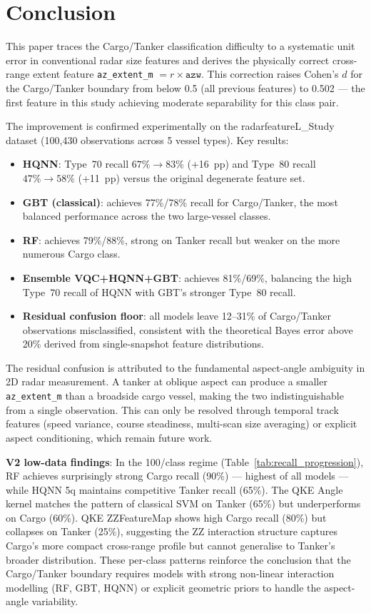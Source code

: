 \documentclass[journal]{IEEEtran}
\begin{document}
\section{Conclusion}

This paper traces the Cargo/Tanker classification difficulty to a systematic
unit error in conventional radar size features and derives the physically correct
cross-range extent feature \texttt{az\_extent\_m} $= r \times \texttt{azw}$.
This correction raises Cohen's $d$ for the Cargo/Tanker boundary from below 0.5
(all previous features) to 0.502 — the first feature in this study achieving
moderate separability for this class pair.

The improvement is confirmed experimentally on the radarfeatureL\_Study dataset
(100,430 observations across 5 vessel types). Key results:
\begin{itemize}
  \item \textbf{HQNN}: Type~70 recall $67\% \to 83\%$ (+16~pp) and Type~80
        recall $47\% \to 58\%$ (+11~pp) versus the original degenerate feature set.
  \item \textbf{GBT (classical)}: achieves 77\%/78\% recall for Cargo/Tanker,
        the most balanced performance across the two large-vessel classes.
  \item \textbf{RF}: achieves 79\%/88\%, strong on Tanker recall but weaker
        on the more numerous Cargo class.
  \item \textbf{Ensemble VQC+HQNN+GBT}: achieves 81\%/69\%, balancing the
        high Type~70 recall of HQNN with GBT's stronger Type~80 recall.
  \item \textbf{Residual confusion floor}: all models leave 12--31\% of
        Cargo/Tanker observations misclassified, consistent with the theoretical
        Bayes error above 20\% derived from single-snapshot feature distributions.
\end{itemize}

The residual confusion is attributed to the fundamental aspect-angle ambiguity
in 2D radar measurement. A tanker at oblique aspect can produce a smaller
\texttt{az\_extent\_m} than a broadside cargo vessel, making the two
indistinguishable from a single observation. This can only be resolved through
temporal track features (speed variance, course steadiness, multi-scan size
averaging) or explicit aspect conditioning, which remain future work.

\noindent\textbf{V2 low-data findings}: In the 100/class regime (Table~\ref{tab:recall_progression}),
RF achieves surprisingly strong Cargo recall (90\%) — highest of all models
— while HQNN 5q maintains competitive Tanker recall (65\%). The QKE Angle
kernel matches the pattern of classical SVM on Tanker (65\%) but underperforms
on Cargo (60\%). QKE ZZFeatureMap shows high Cargo recall (80\%) but collapses
on Tanker (25\%), suggesting the ZZ interaction structure captures Cargo's more
compact cross-range profile but cannot generalise to Tanker's broader distribution.
These per-class patterns reinforce the conclusion that the Cargo/Tanker boundary
requires models with strong non-linear interaction modelling (RF, GBT, HQNN)
or explicit geometric priors to handle the aspect-angle variability.
\end{document}
